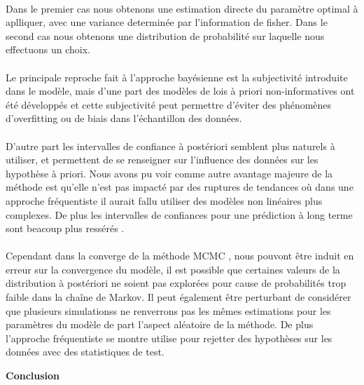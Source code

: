 \documentclass{article}
\theoremstyle{definition}
\theoremstyle{remark}
\begin{document}
\paragraph{}
Dans le premier cas nous obtenons une estimation directe du paramètre optimal à aplliquer, avec une variance determinée par 
l'information de fisher. Dans le second cas nous obtenons une distribution de probabilité sur laquelle nous effectuons un choix.
\paragraph{}
Le principale reproche fait à l'approche bayésienne est la subjectivité introduite dans le modèle, mais d'une part des modèles de lois 
à priori non-informatives ont été développés et cette subjectivité peut permettre d'éviter des phénomènes
 d'overfitting ou de biais dans l'échantillon des données.
\paragraph{}
D'autre part les intervalles de confiance à postériori semblent plus naturels à utiliser, et permettent de se renseigner sur l'influence des données
sur les hypothèse à priori. Nous avons pu voir comme autre avantage majeure de la méthode est qu'elle n'est pas impacté par des ruptures
de tendances où dans une approche fréquentiste il aurait fallu utiliser des modèles non linéaires plus complexes. De plus les  intervalles 
de confiances pour une prédiction à long terme sont beacoup plus ressérés . 
\paragraph{}
Cependant dans la converge de la méthode MCMC , nous pouvont être induit en erreur sur la convergence du modèle, il est possible 
que certaines valeurs de la distribution à postériori ne soient pas explorées pour cause de probabilités trop faible dans la chaîne de Markov. Il peut 
également être perturbant de considérer que plusieurs simulationss ne renverrons pas les mêmes estimations pour 
les paramètres du modèle de part l'aspect aléatoire de la méthode. De plus l'approche fréquentiste se montre utilise 
pour rejetter des hypothèses sur les données avec des statistiques de test.



\newpage

\textbf{\Huge Conclusion}
\end{document}
